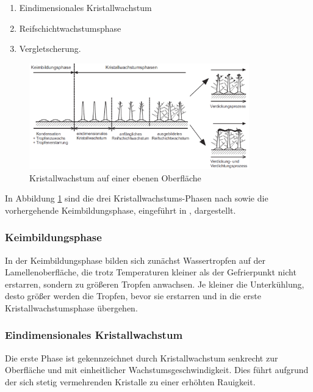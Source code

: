 \begin{enumerate}
\item Eindimensionales Kristallwachstum
\item Reifschichtwachstumsphase 
\item Vergletscherung.
\end{enumerate}


\begin{figure}[htb]
\centering		\includegraphics[width=0.85\textwidth]{Pictures/Reifbildungsphasen_Schydlo.png}
\caption{Kristallwachstum auf einer ebenen Oberfläche \citep{Schydlo2010}}
\label{fig:Kristallwachstum}
\end{figure}


In Abbildung \ref{fig:Kristallwachstum} sind die drei Kristallwachstums-Phasen nach \textsc{\citeauthor{Hayashi1977}} sowie die vorhergehende Keimbildungsphase, eingeführt in \citep{Sahinagic2004}, dargestellt. 

\subsubsection*{Keimbildungsphase}

In der Keimbildungsphase bilden sich zunächst Wassertropfen auf der Lamellenoberfläche, die trotz Temperaturen kleiner als der Gefrierpunkt nicht erstarren, sondern zu größeren Tropfen anwachsen. Je kleiner die Unterkühlung, desto größer werden die Tropfen, bevor sie erstarren und in die erste Kristallwachstumsphase übergehen. 

\subsubsection*{Eindimensionales Kristallwachstum}
Die erste Phase ist gekennzeichnet durch Kristallwachstum senkrecht zur Oberfläche und mit einheitlicher Wachstumsgeschwindigkeit. Dies führt aufgrund der sich stetig vermehrenden Kristalle zu einer erhöhten Rauigkeit.  

